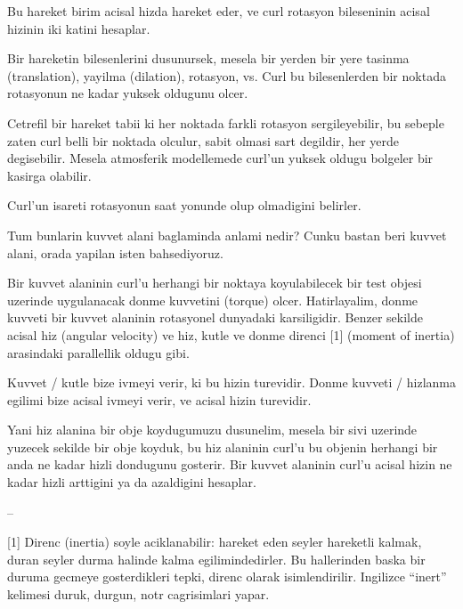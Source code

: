 \documentclass[12pt,fleqn]{article}
\begin{document}
Bu hareket birim acisal hizda hareket eder, ve curl rotasyon bileseninin
acisal hizinin iki katini hesaplar.

Bir hareketin bilesenlerini dusunursek, mesela bir yerden bir yere tasinma
(translation), yayilma (dilation), rotasyon, vs. Curl bu bilesenlerden
bir noktada rotasyonun ne kadar yuksek oldugunu olcer. 

Cetrefil bir hareket tabii ki her noktada farkli rotasyon sergileyebilir,
bu sebeple zaten curl belli bir noktada olculur, sabit olmasi sart
degildir, her yerde degisebilir. Mesela atmosferik modellemede curl'un
yuksek oldugu bolgeler bir kasirga olabilir. 

Curl'un isareti rotasyonun saat yonunde olup olmadigini belirler. 

Tum bunlarin kuvvet alani baglaminda anlami nedir? Cunku bastan beri kuvvet
alani, orada yapilan isten bahsediyoruz. 

Bir kuvvet alaninin curl'u herhangi bir noktaya koyulabilecek bir test
objesi uzerinde uygulanacak donme kuvvetini (torque) olcer. Hatirlayalim,
donme kuvveti bir kuvvet alaninin rotasyonel dunyadaki karsiligidir. Benzer
sekilde acisal hiz (angular velocity) ve hiz, kutle ve donme direnci [1]
(moment of inertia) arasindaki parallellik oldugu gibi. 

Kuvvet / kutle bize ivmeyi verir, ki bu hizin turevidir. Donme kuvveti /
hizlanma egilimi bize acisal ivmeyi verir, ve acisal hizin turevidir. 

Yani hiz alanina bir obje koydugumuzu dusunelim, mesela bir sivi uzerinde
yuzecek sekilde bir obje koyduk, bu hiz alaninin curl'u bu objenin herhangi
bir anda ne kadar hizli dondugunu gosterir. Bir kuvvet alaninin curl'u
acisal hizin ne kadar hizli arttigini ya da azaldigini hesaplar.

--

[1] Direnc (inertia) soyle aciklanabilir: hareket eden seyler hareketli
kalmak, duran seyler durma halinde kalma egilimindedirler. Bu hallerinden
baska bir duruma gecmeye gosterdikleri tepki, direnc olarak
isimlendirilir. Ingilizce ``inert'' kelimesi duruk, durgun, notr
cagrisimlari yapar. 
\end{document}
